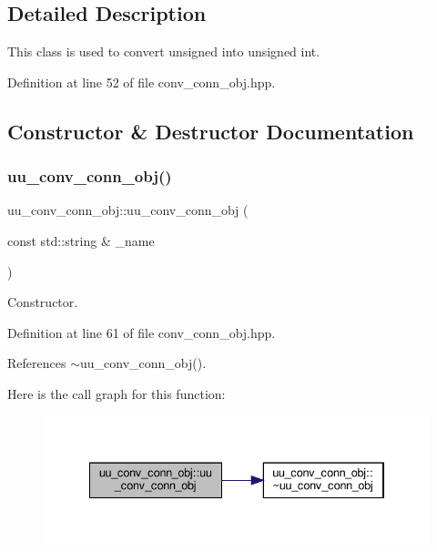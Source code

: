 \subsection{Detailed Description}
This class is used to convert unsigned into unsigned int. 

Definition at line 52 of file conv\+\_\+conn\+\_\+obj.\+hpp.



\subsection{Constructor \& Destructor Documentation}
\mbox{\label{classuu__conv__conn__obj_abc9f90423b06e36114d0d77a05945dc4}} 
\subsubsection{\texorpdfstring{uu\+\_\+conv\+\_\+conn\+\_\+obj()}{uu\_conv\_conn\_obj()}}
{\footnotesize\ttfamily uu\+\_\+conv\+\_\+conn\+\_\+obj\+::uu\+\_\+conv\+\_\+conn\+\_\+obj (\begin{DoxyParamCaption}\item[{const std\+::string \&}]{\+\_\+name }\end{DoxyParamCaption})\hspace{0.3cm}{\ttfamily [inline]}}



Constructor. 



Definition at line 61 of file conv\+\_\+conn\+\_\+obj.\+hpp.



References $\sim$uu\+\_\+conv\+\_\+conn\+\_\+obj().

Here is the call graph for this function\+:
\nopagebreak
\begin{figure}[H]
\begin{center}
\leavevmode
\includegraphics[width=334pt]{d4/d8c/classuu__conv__conn__obj_abc9f90423b06e36114d0d77a05945dc4_cgraph}
\end{center}
\end{figure}
\mbox{\label{classuu__conv__conn__obj_ae76c470f81fe09c19357f01bb4b894a3}} 
